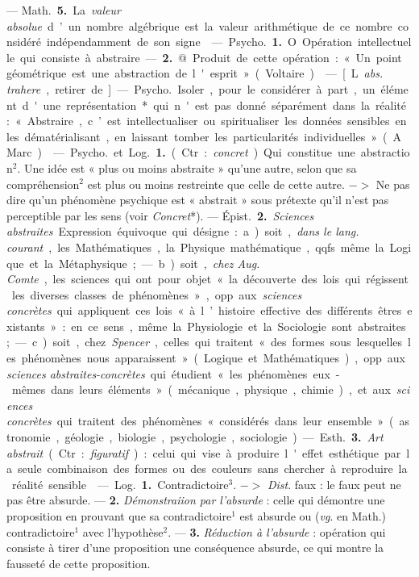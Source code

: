 \begin{itemize}[leftmargin=1cm, label=, itemsep=1pt]
 — \si{Math.} {\bf 5.} La {\it valeur absolue} d’un
nombre algébrique est la valeur
arithmétique de ce nombre considéré
indépendamment de son signe.

 — \si{Psycho.} {\bf 1.} O Opération
intellectuelle qui consiste à
abstraire. — {\bf 2.} @ Produit de cette
opération : « Un point géométrique est
une abstraction de l'esprit » (Voltaire).

 — [L. {\it abs. trahere}, retirer de]
— \si{Psycho.} Isoler, pour le considérer
à part, un élément d'une représentation*
qui n'est pas donné séparément
dans la réalité : « Abstraire,
c’est intellectualiser ou spiritualiser
les données sensibles en les dématérialisant,
en laissant tomber les
particularités individuelles » (A.
Marc).

 — \si{Psycho.} et \si{Log.} {\bf 1.} (Ctr. :
{\it concret}). Qui constitue une abstraction$^2$.
Une idée est « plus ou moins
abstraite » qu'une autre, selon que
sa compréhension$^2$ est plus ou
moins restreinte que celle de cette
autre. $->$ Ne pas dire qu’un phénomène
psychique est « abstrait »
sous prétexte qu'il n’est pas perceptible
par les sens (voir {\it Concret}*). —
\si{Épist.} {\bf 2.} {\it Sciences abstraites}. Expression
équivoque qui désigne : a) soit,
{\it dans le lang. courant}, les Mathématiques,
la Physique mathématique,
qqfs. même la Logique et la Métaphysique;
— b) soit, {\it chez Aug.
Comte}, les sciences qui ont pour
objet « la découverte des lois qui
régissent les diverses classes de phénomènes »,
opp. aux {\it sciences concrètes}
qui appliquent ces lois « à l’histoire
effective des différents êtres existants » :
en ce sens, même la Physiologie
et la Sociologie sont abstraites;
— c) soit, chez {\it Spencer}, celles qui
traitent « des formes sous lesquelles
les phénomènes nous apparaissent »
(Logique et Mathématiques), opp.
aux {\it sciences abstraites-concrètes} qui
étudient « les phénomènes eux-mêmes
dans leurs éléments » (mécanique,
physique, chimie), et aux
{\it sciences concrètes} qui traitent des
phénomènes « considérés dans leur
ensemble » (astronomie, géologie,
biologie, psychologie, sociologie).

— \si{Esth.} {\bf 3.} {\it Art abstrait} (Ctr : {\it figuratif}) : celui qui vise à produire
l'effet esthétique par la seule combinaison des formes ou des couleurs
sans chercher à reproduire la réalité
sensible.

 — \si{Log.} {\bf 1.} Contradictoire$^3$.
$->$ {\it Dist}. faux : le faux peut ne pas
être absurde. — {\bf 2.} {\it Démonstraiion
par l'absurde} : celle qui démontre
une proposition en prouvant que sa
contradictoire$^1$ est absurde ou ({\it vg}.
en Math.) contradictoire$^1$ avec l’hypothèse$^2$. — {\bf 3.} {\it Réduction à l'absurde} :
opération qui consiste à tirer d’une
proposition une conséquence absurde,
ce qui montre la fausseté de cette
proposition.


\end{itemize}
